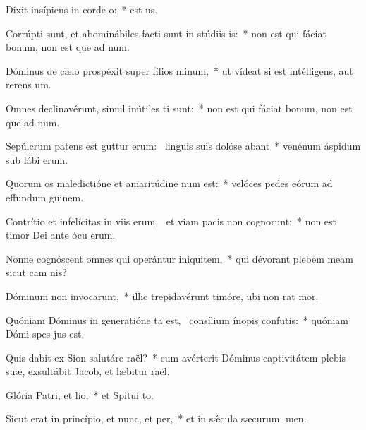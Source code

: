 \item Dixit insípiens in corde o:~*  est us.
\item Corrúpti sunt, et abominábiles facti sunt in stúdiis is:~* non est qui fáciat bonum, non est que ad num.
\item Dóminus de cælo prospéxit super fílios minum,~* ut vídeat si est intélligens, aut rerens um.
\item Omnes declinavérunt, simul inútiles ti sunt:~* non est qui fáciat bonum, non est que ad num.
\item Sepúlcrum patens est guttur erum:~\pscross{} linguis suis dolóse abant~* venénum áspidum sub lábi erum.
\item Quorum os maledictióne et amaritúdine num est:~* velóces pedes eórum ad effundum guinem.
\item Contrítio et infelícitas in viis erum,~\pscross{} et viam pacis non cognorunt:~* non est timor Dei ante ócu erum.
\item Nonne cognóscent omnes qui operántur iniquitem,~* qui dévorant plebem meam sicut cam nis?
\item Dóminum non invocarunt,~* illic trepidavérunt timóre, ubi non rat mor.
\item Quóniam Dóminus in generatióne ta est,~\pscross{} consílium ínopis confutis:~* quóniam Dómi spes jus est.
\item Quis dabit ex Sion salutáre raël?~* cum avérterit Dóminus captivitátem plebis suæ, exsultábit Jacob, et læbitur raël.
\item Glória Patri, et lio,~* et Spitui to.
\item Sicut erat in princípio, et nunc, et per,~* et in sǽcula sæcurum. men.
